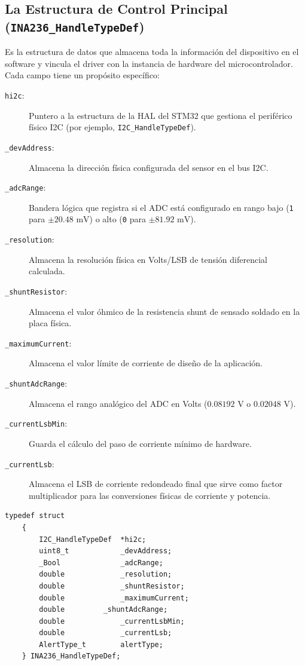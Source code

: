 \documentclass[
10pt, %
a4paper, %
oneside, %
headinclude,footinclude, %
BCOR5mm, %
]{scrartcl}
\begin{document}
\subsection{La Estructura de Control Principal (\texttt{INA236\_HandleTypeDef})}
Es la estructura de datos que almacena toda la información del dispositivo en el software y vincula el driver con la instancia de hardware del microcontrolador. Cada campo tiene un propósito específico:

\begin{description}
	\item[\texttt{hi2c}:] Puntero a la estructura de la HAL del STM32 que gestiona el periférico físico I2C (por ejemplo, \texttt{I2C\_HandleTypeDef}).
	\item[\texttt{\_devAddress}:] Almacena la dirección física configurada del sensor en el bus I2C.
	\item[\texttt{\_adcRange}:] Bandera lógica que registra si el ADC está configurado en rango bajo (\texttt{1} para $\pm 20.48\text{ mV}$) o alto (\texttt{0} para $\pm 81.92\text{ mV}$).
	\item[\texttt{\_resolution}:] Almacena la resolución física en Volts/LSB de tensión diferencial calculada.
	\item[\texttt{\_shuntResistor}:] Almacena el valor óhmico de la resistencia shunt de sensado soldado en la placa física.
	\item[\texttt{\_maximumCurrent}:] Almacena el valor límite de corriente de diseño de la aplicación.
	\item[\texttt{\_shuntAdcRange}:] Almacena el rango analógico del ADC en Volts ($0.08192\text{ V}$ o $0.02048\text{ V}$).
	\item[\texttt{\_currentLsbMin}:] Guarda el cálculo del paso de corriente mínimo de hardware.
	\item[\texttt{\_currentLsb}:] Almacena el LSB de corriente redondeado final que sirve como factor multiplicador para las conversiones físicas de corriente y potencia.
\end{description}

\begin{lstlisting}[style=CMakeStyle]
	typedef struct 
	{
		I2C_HandleTypeDef  *hi2c;
		uint8_t            _devAddress;
		_Bool              _adcRange;
		double             _resolution;
		double             _shuntResistor;
		double             _maximumCurrent;
		double 		   _shuntAdcRange;
		double             _currentLsbMin;
		double             _currentLsb;
		AlertType_t        alertType;
	} INA236_HandleTypeDef;
\end{lstlisting}
\end{document}
